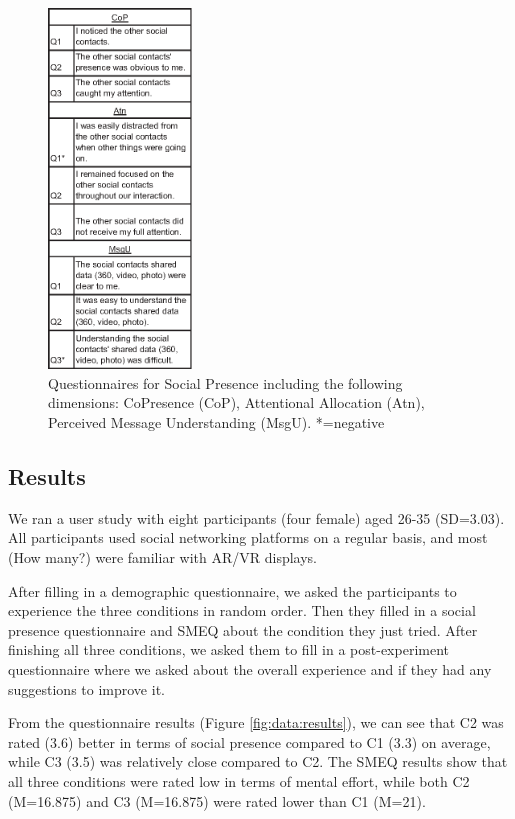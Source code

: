 \begin{figure}[ht]
    \centering
    \includegraphics[width=1.5in]{images/chi/images-02.eps}
    \caption{Questionnaires for Social Presence including the following dimensions: CoPresence (CoP), Attentional Allocation (Atn), Perceived Message Understanding (MsgU). *=negative} 
      \label{tbl:questions}
\end{figure}

\subsection{Results}

We ran a user study with eight participants (four female) aged 26-35 (SD=3.03). All participants used social networking platforms on a regular basis, and most (How many?) were familiar with AR/VR displays. 

After filling in a demographic questionnaire, we asked the participants to experience the three conditions in random order. Then they filled in a social presence questionnaire and SMEQ about the condition they just tried. After finishing all three conditions, we asked them to fill in a post-experiment questionnaire where we asked about the overall experience and if they had any suggestions to improve it. 

From the questionnaire results (Figure \ref{fig:data:results}), we can see that C2 was rated (3.6) better in terms of social presence compared to C1 (3.3) on average, while C3 (3.5) was relatively close compared to C2. The SMEQ results show that all three conditions were rated low in terms of mental effort, while both C2 (M=16.875) and C3 (M=16.875) were rated lower than C1 (M=21).

